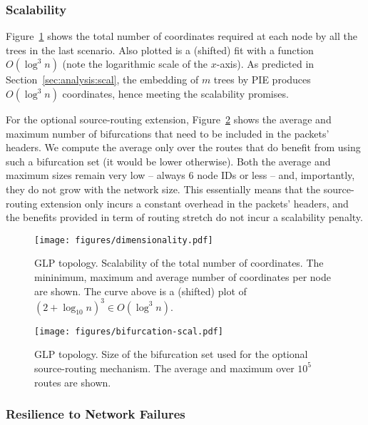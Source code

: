 \documentclass[conference]{IEEEtran}
\begin{document}
\subsubsection{Scalability}
Figure~\ref{fig:scalGLP} shows the total number of coordinates required at each node by all the trees in the last scenario.
Also plotted is a (shifted) fit with a function $O(\log^3 n)$ (note the logarithmic scale of the $x$-axis). As predicted in Section~\ref{sec:analysis:scal}, the embedding of $m$ trees by PIE produces $O(\log^3 n)$ coordinates, hence meeting the scalability promises.

For the optional source-routing extension, Figure~\ref{fig:bif} shows the average and maximum number of bifurcations that need to be included in the packets' headers. We compute the average only over the routes that do benefit from using such a bifurcation set (it would be lower otherwise). 
Both the average and maximum sizes remain very low -- always $6$ node IDs or less -- and, importantly, they do not grow with the network size. This essentially means that the source-routing extension only incurs a constant overhead in the packets' headers, and the benefits provided in term of routing stretch do not incur a scalability penalty.



\begin{figure}[t]
\centering
\texttt{[image: figures/dimensionality.pdf]}\vspace{-1em}
\caption{GLP topology. Scalability of the total number of coordinates. The mininimum, maximum and average number of coordinates per node are shown. The curve above is a (shifted) plot of $(2+\log_{10} n)^3 \in O(\log^3 n)$.}
\label{fig:scalGLP}
\end{figure}

\begin{figure}[t]
\centering
\texttt{[image: figures/bifurcation-scal.pdf]}\vspace{-1em}
\caption{GLP topology. Size of the bifurcation set used for the optional source-routing mechanism. The average and maximum over $10^5$ routes are shown.}
\vspace{-1.1em}
\label{fig:bif}
\end{figure}

\subsubsection{Resilience to Network Failures}
\end{document}
